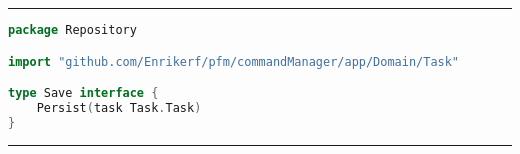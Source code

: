 
\phantom{blank}
\vspace{5mm}
\hrule
\begin{lstlisting}[language=Go,caption={SavePort.go},breaklines=true,label={lst:SavePort}]
package Repository

import "github.com/Enrikerf/pfm/commandManager/app/Domain/Task"

type Save interface {
	Persist(task Task.Task)
}


\end{lstlisting}
\hrule